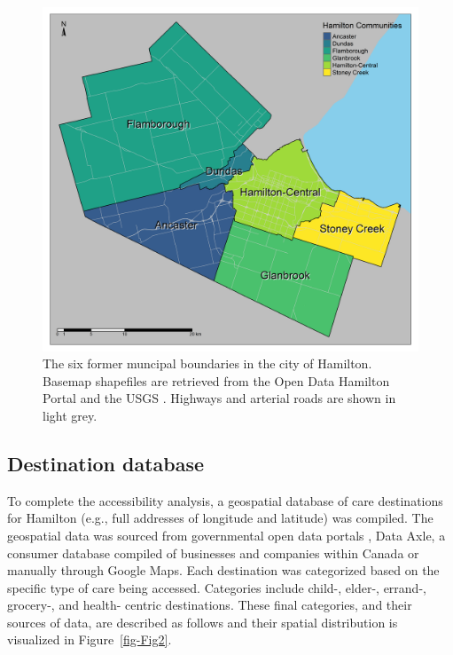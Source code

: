 \documentclass[
  super,
  preprint,
  3p]{elsarticle}
\begin{document}
\begin{figure}

{\centering \includegraphics[width=6.25in,height=\textheight]{figures/Fig1-boundaries.png}

}

\caption{\label{fig-Fig1}The six former muncipal boundaries in the city
of Hamilton. Basemap shapefiles are retrieved from the Open Data
Hamilton Portal \citep{opendatahamiltonCityBoundary2023} and the USGS
\citep{greatlakesUSGS2010}. Highways and arterial roads are shown in
light grey.}

\end{figure}

\hypertarget{destination-database}{%
\subsection{Destination database}\label{destination-database}}

To complete the accessibility analysis, a geospatial database of care
destinations for Hamilton (e.g., full addresses of longitude and
latitude) was compiled. The geospatial data was sourced from
governmental open data portals
\citep{governmentofontarioOntarioDataCatalogue2023, cityofhamiltonOpenData2023},
Data Axle, a consumer database compiled of businesses and companies
within Canada \citep{axledataConsumerData2023} or manually through
Google Maps. Each destination was categorized based on the specific type
of care being accessed. Categories include child-, elder-, errand-,
grocery-, and health- centric destinations. These final categories, and
their sources of data, are described as follows and their spatial
distribution is visualized in Figure~\ref{fig-Fig2}.
\end{document}
